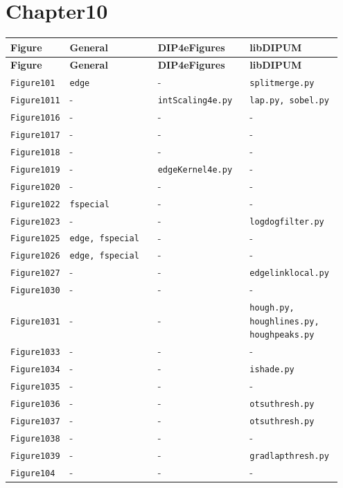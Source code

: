 \documentclass[10pt]{article}
\begin{document}
\section*{Chapter10}
\setlength{\tabcolsep}{4pt}
\begin{longtable}{p{0.11\linewidth} p{0.28\linewidth} p{0.28\linewidth} p{0.28\linewidth}}
\toprule
\textbf{Figure} & \textbf{General} & \textbf{DIP4eFigures} & \textbf{libDIPUM} \\
\midrule
\endfirsthead
\toprule
\textbf{Figure} & \textbf{General} & \textbf{DIP4eFigures} & \textbf{libDIPUM} \\
\midrule
\endhead
\bottomrule
\endfoot
\texttt{Figure101} & \texttt{edge} & - & \texttt{splitmerge.py} \\
\texttt{Figure1011} & - & \texttt{intScaling4e.py} & \texttt{lap.py, sobel.py} \\
\texttt{Figure1016} & - & - & - \\
\texttt{Figure1017} & - & - & - \\
\texttt{Figure1018} & - & - & - \\
\texttt{Figure1019} & - & \texttt{edgeKernel4e.py} & - \\
\texttt{Figure1020} & - & - & - \\
\texttt{Figure1022} & \texttt{fspecial} & - & - \\
\texttt{Figure1023} & - & - & \texttt{logdogfilter.py} \\
\texttt{Figure1025} & \texttt{edge, fspecial} & - & - \\
\texttt{Figure1026} & \texttt{edge, fspecial} & - & - \\
\texttt{Figure1027} & - & - & \texttt{edgelinklocal.py} \\
\texttt{Figure1030} & - & - & - \\
\texttt{Figure1031} & - & - & \texttt{hough.py, houghlines.py, houghpeaks.py} \\
\texttt{Figure1033} & - & - & - \\
\texttt{Figure1034} & - & - & \texttt{ishade.py} \\
\texttt{Figure1035} & - & - & - \\
\texttt{Figure1036} & - & - & \texttt{otsuthresh.py} \\
\texttt{Figure1037} & - & - & \texttt{otsuthresh.py} \\
\texttt{Figure1038} & - & - & - \\
\texttt{Figure1039} & - & - & \texttt{gradlapthresh.py} \\
\texttt{Figure104} & - & - & - \\

\end{longtable}
\end{document}
